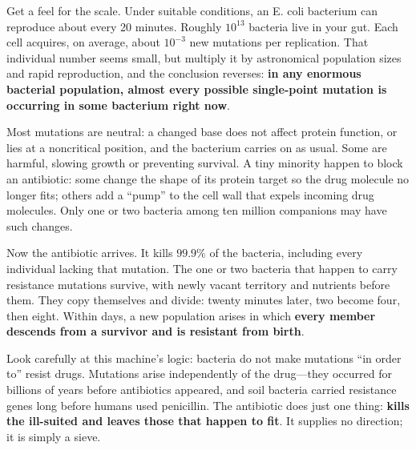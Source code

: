 Get a feel for the scale. Under suitable conditions, an E. coli bacterium can reproduce about every 20 minutes. Roughly $10^{13}$ bacteria live in your gut. Each cell acquires, on average, about $10^{-3}$ new mutations per replication. That individual number seems small, but multiply it by astronomical population sizes and rapid reproduction, and the conclusion reverses: \textbf{in any enormous bacterial population, almost every possible single-point mutation is occurring in some bacterium right now}.

Most mutations are neutral: a changed base does not affect protein function, or lies at a noncritical position, and the bacterium carries on as usual. Some are harmful, slowing growth or preventing survival. A tiny minority happen to block an antibiotic: some change the shape of its protein target so the drug molecule no longer fits; others add a ``pump'' to the cell wall that expels incoming drug molecules. Only one or two bacteria among ten million companions may have such changes.

Now the antibiotic arrives. It kills $99.9\%$ of the bacteria, including every individual lacking that mutation. The one or two bacteria that happen to carry resistance mutations survive, with newly vacant territory and nutrients before them. They copy themselves and divide: twenty minutes later, two become four, then eight. Within days, a new population arises in which \textbf{every member descends from a survivor and is resistant from birth}.

Look carefully at this machine's logic: bacteria do not make mutations ``in order to'' resist drugs. Mutations arise independently of the drug---they occurred for billions of years before antibiotics appeared, and soil bacteria carried resistance genes long before humans used penicillin. The antibiotic does just one thing: \textbf{kills the ill-suited and leaves those that happen to fit}. It supplies no direction; it is simply a sieve.

